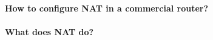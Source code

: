 \documentclass[compilation.tex]{subfiles}
\begin{document}
\paragraph{How to configure NAT in a commercial router?}

\paragraph{What does NAT do?}

%
\end{document}
